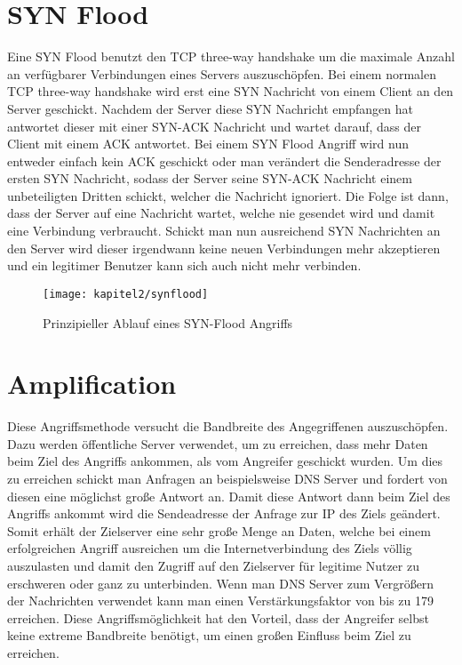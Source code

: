 \section{SYN Flood}

Eine SYN Flood benutzt den TCP three-way handshake um die maximale Anzahl an verfügbarer Verbindungen eines Servers auszuschöpfen. Bei einem normalen TCP three-way handshake wird erst eine SYN Nachricht von einem Client an den Server geschickt. Nachdem der Server diese SYN Nachricht empfangen hat antwortet dieser mit einer SYN-ACK Nachricht und wartet darauf, dass der Client mit einem ACK antwortet. Bei einem SYN Flood Angriff wird nun entweder einfach kein ACK geschickt oder man verändert die Senderadresse der ersten SYN Nachricht, sodass der Server seine SYN-ACK Nachricht einem unbeteiligten Dritten schickt, welcher die Nachricht ignoriert. Die Folge ist dann, dass der Server auf eine Nachricht wartet, welche nie gesendet wird und damit eine Verbindung verbraucht. Schickt man nun ausreichend SYN Nachrichten an den Server wird dieser irgendwann keine neuen Verbindungen mehr akzeptieren und ein legitimer Benutzer kann sich auch nicht mehr verbinden.

\begin{figure}[h]
		\centering
		\texttt{[image: kapitel2/synflood]}
		\caption[SYN-Flooding]{Prinzipieller Ablauf eines SYN-Flood Angriffs}
		\label{img:synflood}
\end{figure}

\section{Amplification}

Diese Angriffsmethode versucht die Bandbreite des Angegriffenen auszuschöpfen. Dazu werden öffentliche Server verwendet, um zu erreichen, dass mehr Daten beim Ziel des Angriffs ankommen, als vom Angreifer geschickt wurden. Um dies zu erreichen schickt man Anfragen an beispielsweise DNS Server und fordert von diesen eine möglichst große Antwort an. Damit diese Antwort dann beim Ziel des Angriffs ankommt wird die Sendeadresse der  Anfrage zur IP des Ziels geändert. Somit erhält der Zielserver eine sehr große Menge an Daten, welche bei einem erfolgreichen Angriff ausreichen um die Internetverbindung des Ziels völlig auszulasten und damit den Zugriff auf den Zielserver für legitime Nutzer zu erschweren oder ganz zu unterbinden. Wenn man DNS Server zum Vergrößern der Nachrichten verwendet kann man einen Verstärkungsfaktor von bis zu 179 erreichen. Diese Angriffsmöglichkeit hat den Vorteil, dass der Angreifer selbst keine extreme Bandbreite benötigt, um einen großen Einfluss beim Ziel zu erreichen.

